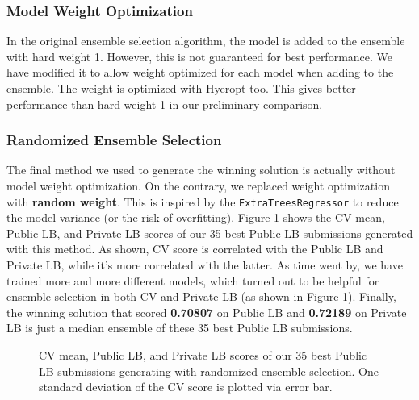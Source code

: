 \documentclass[12pt]{article}
\begin{document}
\subsubsection{Model Weight Optimization}
In the original ensemble selection algorithm, the model is added to the ensemble with hard weight 1. However, this is not guaranteed for best performance. We have modified it to allow weight optimized for each model when adding to the ensemble. The weight is optimized with Hyeropt too. This gives better performance than hard weight 1 in our preliminary comparison.

\subsubsection{Randomized Ensemble Selection}
The final method we used to generate the winning solution is actually without model weight optimization. On the contrary, we replaced weight optimization with \textbf{random weight}. This is inspired by the \texttt{ExtraTreesRegressor} to reduce the model variance (or the risk of overfitting). Figure \ref{fig:CV_Public_Private} shows the CV mean, Public LB, and Private LB scores of our 35 best Public LB submissions generated with this method. As shown, CV score is correlated with the Public LB and Private LB, while it's more correlated with the latter. As time went by, we have trained more and more different models, which turned out to be helpful for ensemble selection in both CV and Private LB (as shown in Figure \ref{fig:CV_Public_Private}). Finally, the winning solution that scored \textbf{0.70807} on Public LB and \textbf{0.72189} on Private LB is just a median ensemble of these 35 best Public LB submissions.

\begin{figure}[t]
\centering
{}
\caption{CV mean, Public LB, and Private LB scores of our 35 best Public LB submissions generating with randomized ensemble selection. One standard deviation of the CV score is plotted via error bar.}
\label{fig:CV_Public_Private}
\end{figure}
\end{document}
